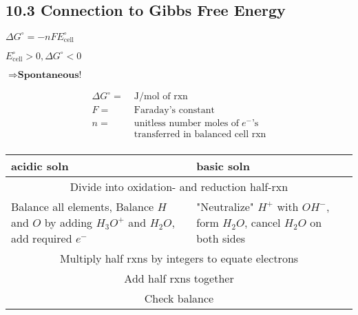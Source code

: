 \subsection{10.3 Connection to Gibbs Free Energy}
\vspace*{-0.5em}
    \begin{minipage}{0.99\linewidth}
        \begin{minipage}{0.32\linewidth}
            \centerline{$\Delta G^\circ = -n F E^\circ_\text{cell}$}
            \vspace*{2em}
            \centerline{$E^\circ_\text{cell} > 0, \Delta G^\circ < 0$}
            \vspace*{0.5em}
            \centerline{$\Rightarrow \textbf{Spontaneous!}$}
        \end{minipage}
        \begin{minipage}{0.61\linewidth}
            \begin{align*}
                \Delta G^\circ =& \; \textrm{J/mol of rxn}\\
                F =& \; \textrm{Faraday's constant}\\
                n =& \; \textrm{unitless number moles of} \; e^- \textrm{'s}\\
                & \; \textrm{transferred in balanced cell rxn}\\
            \end{align*}
        \end{minipage}
    \end{minipage}

\begin{tabular}{p{32mm} | p{32mm}}
    \textbf{acidic soln} & \textbf{basic soln}\\
    \hline
    \multicolumn{2}{c}{Divide into oxidation- and reduction half-rxn}\\
    Balance all elements, Balance $H$ and $O$ by adding $H_3O^+$ and $H_2O$, add required $e^-$ & "Neutralize" $H^+$ with $OH^-$, form $H_2O$, cancel $H_2O$ on both sides\\
    \multicolumn{2}{c}{Multiply half rxns by integers to equate electrons}\\
    \multicolumn{2}{c}{Add half rxns together}\\
    \multicolumn{2}{c}{Check balance}
\end{tabular}